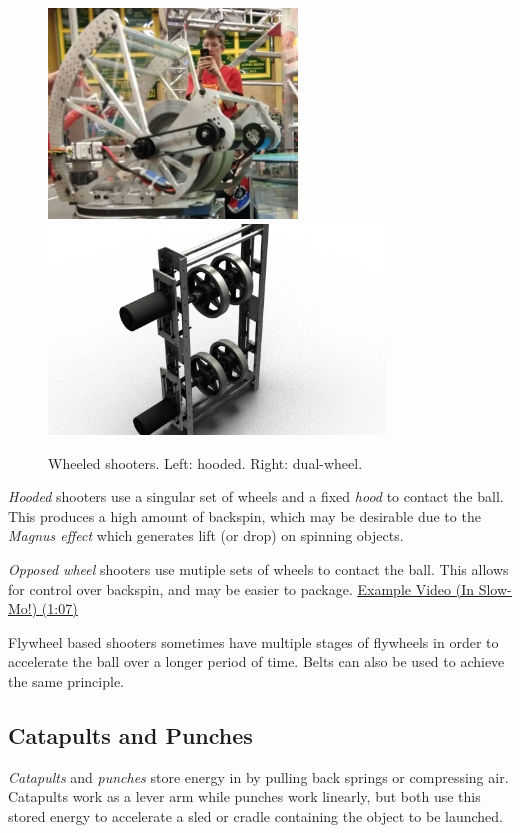 \begin{figure}[H]
	\includegraphics[height=2.2in]{imgs/shooter_hooded.png}
	\includegraphics[height=2.2in]{imgs/shooter_dualwheel.jpeg}
	\caption{Wheeled shooters. Left: hooded. Right: dual-wheel.}
\end{figure}

\textit{Hooded} shooters use a singular set of wheels and a fixed \textit{hood} to contact the ball. This produces a high amount of backspin, which may be desirable due to the \textit{Magnus effect} which generates lift (or drop) on spinning objects.

\textit{Opposed wheel} shooters use mutiple sets of wheels to contact the ball. This allows for control over backspin, and may be easier to package. \href{https://youtu.be/pgMU_AxzxAE?t=67}{\color{red}\underline{Example Video (In Slow-Mo!) (1:07)}}

Flywheel based shooters sometimes have multiple stages of flywheels in order to accelerate the ball over a longer period of time. Belts can also be used to achieve the same principle.
\subsection{Catapults and Punches}
\textit{Catapults} and \textit{punches} store energy in by pulling back springs or compressing air. Catapults work as a lever arm while punches work linearly, but both use this stored energy to accelerate a sled or cradle containing the object to be launched.

